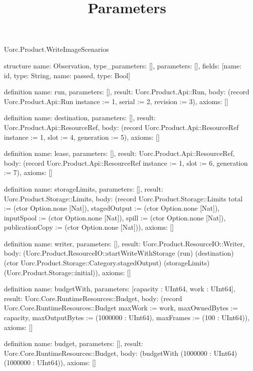 \begin{lexlean}{Uorc.Product.WriteImageScenarios}
\title{Parameters}
\begin{semanticmodule}
structure{
  name: Observation,
  type_parameters: [],
  parameters: [],
  fields: [{name: id, type: String}, {name: passed, type: Bool}]
}

definition{
  name: run,
  parameters: [],
  result: Uorc.Product.Api::Run,
  body: (record Uorc.Product.Api::Run {instance := 1, serial := 2, revision := 3}),
  axioms: []
}

definition{
  name: destination,
  parameters: [],
  result: Uorc.Product.Api::ResourceRef,
  body: (record Uorc.Product.Api::ResourceRef {instance := 1, slot := 4, generation := 5}),
  axioms: []
}

definition{
  name: lease,
  parameters: [],
  result: Uorc.Product.Api::ResourceRef,
  body: (record Uorc.Product.Api::ResourceRef {instance := 1, slot := 6, generation := 7}),
  axioms: []
}

definition{
  name: storageLimits,
  parameters: [],
  result: Uorc.Product.Storage::Limits,
  body: (record Uorc.Product.Storage::Limits {total := (ctor Option.none [Nat]), stagedOutput := (ctor Option.none [Nat]), inputSpool := (ctor Option.none [Nat]), spill := (ctor Option.none [Nat]), publicationCopy := (ctor Option.none [Nat])}),
  axioms: []
}

definition{
  name: writer,
  parameters: [],
  result: Uorc.Product.ResourceIO::Writer,
  body: (Uorc.Product.ResourceIO::startWriteWithStorage (run) (destination) (ctor Uorc.Product.Storage::Category.stagedOutput) (storageLimits) (Uorc.Product.Storage::initial)),
  axioms: []
}

definition{
  name: budgetWith,
  parameters: [capacity : UInt64, work : UInt64],
  result: Uorc.Core.RuntimeResources::Budget,
  body: (record Uorc.Core.RuntimeResources::Budget {maxWork := work, maxOwnedBytes := capacity, maxOutputBytes := (1000000 : UInt64), maxFrames := (100 : UInt64)}),
  axioms: []
}

definition{
  name: budget,
  parameters: [],
  result: Uorc.Core.RuntimeResources::Budget,
  body: (budgetWith (1000000 : UInt64) (1000000 : UInt64)),
  axioms: []
}


\end{semanticmodule}
\end{lexlean}
